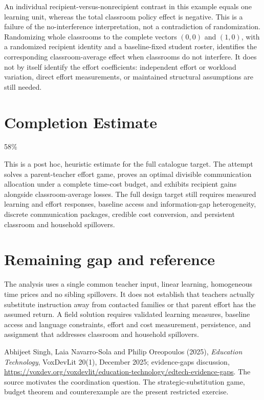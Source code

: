 \documentclass[11pt,a4paper]{article}
\theoremstyle{definition}
\theoremstyle{remark}
\begin{document}
An individual recipient-versus-nonrecipient contrast in this example equals one learning unit, whereas the total classroom policy effect is negative. This is a failure of the no-interference interpretation, not a contradiction of randomization. Randomizing whole classrooms to the complete vectors $(0,0)$ and $(1,0)$, with a randomized recipient identity and a baseline-fixed student roster, identifies the corresponding classroom-average effect when classrooms do not interfere. It does not by itself identify the effort coefficients: independent effort or workload variation, direct effort measurements, or maintained structural assumptions are still needed.

\section{Completion Estimate}
58\%

This is a post hoc, heuristic estimate for the full catalogue target.
The attempt solves a parent-teacher effort game, proves an optimal divisible communication allocation under a complete time-cost budget, and exhibits recipient gains alongside classroom-average losses. The full design target still requires measured learning and effort responses, baseline access and information-gap heterogeneity, discrete communication packages, credible cost conversion, and persistent classroom and household spillovers.

\section{Remaining gap and reference}
The analysis uses a single common teacher input, linear learning, homogeneous time prices and no sibling spillovers. It does not establish that teachers actually substitute instruction away from contacted families or that parent effort has the assumed return. A field solution requires validated learning measures, baseline access and language constraints, effort and cost measurement, persistence, and assignment that addresses classroom and household spillovers.

Abhijeet Singh, Laia Navarro-Sola and Philip Oreopoulos (2025), \emph{Education Technology}, VoxDevLit 20(1), December 2025; evidence-gaps discussion, \url{https://voxdev.org/voxdevlit/education-technology/edtech-evidence-gaps}. The source motivates the coordination question. The strategic-substitution game, budget theorem and counterexample are the present restricted exercise.
\end{document}
